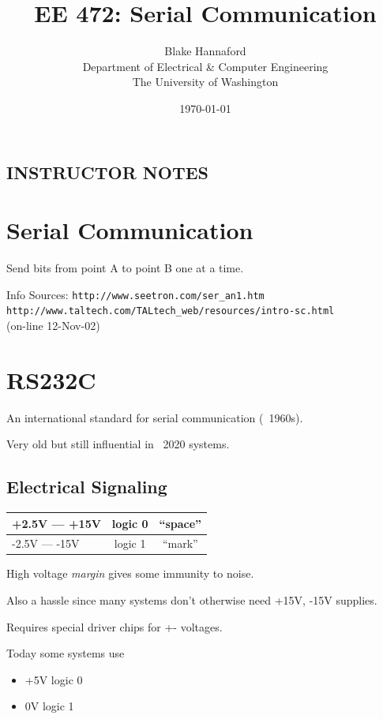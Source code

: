 \documentclass{article}	%
\title{EE 472:  Serial Communication}
\author{Blake Hannaford\\
        Department of Electrical \& Computer Engineering \\
        The University of Washington
}
\date{\today}
\begin{document}


 

\maketitle
\subsection*{INSTRUCTOR NOTES}	%

\section{Serial Communication}

Send bits from point A to point B one at a time.

Info Sources:
{\tt http://www.seetron.com/ser\_an1.htm} \\
{\tt http://www.taltech.com/TALtech\_web/resources/intro-sc.html }\\
(on-line 12-Nov-02)

\section*{RS232C}

An international standard for serial communication (~1960s).

Very old but still influential in ~2020 systems.

\subsection{Electrical Signaling}

\begin{tabular}{|l|c|c|}\hline
+2.5V --- +15V  &  logic 0 &  ``space'' \\ \hline
-2.5V --- -15V  &  logic 1 &  ``mark''  \\ \hline
\end{tabular}

High voltage {\it margin} gives some immunity to noise.

Also a hassle since many systems don't otherwise
need +15V, -15V supplies.

Requires special driver chips for +- voltages.

Today some systems use

\begin{itemize}
        \item +5V logic 0
        \item  0V logic 1
\end{itemize}
\end{document}
